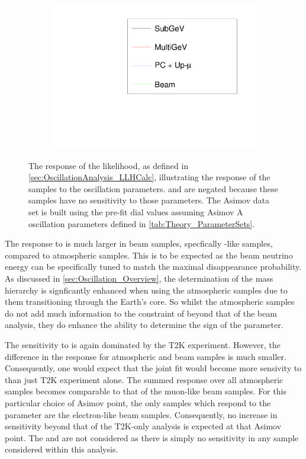\begin{figure}[h]
\begin{subfigure}[t]{0.5\textwidth}
    \includegraphics[width=\textwidth, trim={0mm 0mm 0mm 0mm}, clip,page=3]{Figures/OA/LLHScans_Osc.pdf}
  \end{subfigure}
  \caption{The response of the likelihood, as defined in \autoref{sec:OscillationAnalysis_LLHCalc}, illustrating the response of the samples to the oscillation parameters. \delmsqsol and \sinsqsol are negated because these samples have no sensitivity to those parameters. The Asimov data set is built using the pre-fit dial values assuming Asimov A oscillation parameters defined in \autoref{tab:Theory_ParameterSets}.}
  \label{fig:OscillationAnalysis_LLHScanOscPars}
\end{figure}

The response to \delmsqatm is much larger in beam samples, specfically \quickmath{\mu}-like samples, compared to atmospheric samples. This is to be expected as the beam neutrino energy can be specifically tuned to match the maximal disappearance probability. As discussed in \autoref{sec:Oscillation_Overview}, the determination of the mass hierarchy is signficantly enhanced when using the atmospheric samples due to them transitioning through the Earth's core. So whilst the atmospheric samples do not add much information to the constraint of  beyond that of the beam analysis, they do enhance the ability to determine the sign of the parameter.

The sensitivity to \sinsqatm is again dominated by the T2K experiment. However, the difference in the response for atmospheric and beam samples is much smaller. Consequently, one would expect that the joint fit would become more sensivity to \sinsqatm than just T2K experiment alone. The summed response over all atmospheric samples becomes comparable to that of the muon-like beam samples. For this particular choice of Asimov point, the only samples which respond to the \sinsqreac parameter are the electron-like beam samples. Consequently, no increase in sensitivity beyond that of the T2K-only analysis is expected at that Asimov point. The \delmsqsol and \sinsqsol are not considered as there is simply no sensitivity in any sample considered within this analysis.
  
